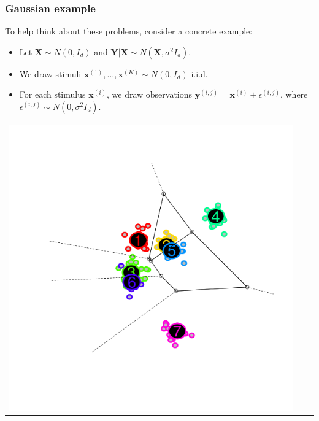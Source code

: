 \documentclass{beamer}
\newcommand{\bx}{\boldsymbol{x}}
\newcommand{\by}{\boldsymbol{y}}
\newcommand{\bX}{\boldsymbol{X}}
\newcommand{\bY}{\boldsymbol{Y}}
\begin{document}
\begin{frame}
\frametitle{Gaussian example}
To help think about these problems, consider a concrete example:
\begin{itemize}
\item Let $\bX \sim N(0, I_d)$ and 
$\bY|\bX \sim N(\bX,\sigma^2 I_d)$.
\item We draw stimuli $\bx^{(1)}, \hdots, \bx^{(K)} \sim N(0, I_d)$ i.i.d.
\item For each stimulus $\bx^{(i)}$, we draw observations $\by^{(i, j)} = \bx^{(i)} + \epsilon^{(i, j)}$, where $\epsilon^{(i, j)} \sim N(0, \sigma^2 I_d)$.
\end{itemize}
\begin{center}
\begin{tabular}{ccc}
\includegraphics[scale = 0.2, clip = true, trim = 0.6in 0.2in 0.6in 0.2in]{../info_theory_paper/gaussian_figure1a.png} &

\end{tabular}
\end{center}
\end{frame}
\end{document}
